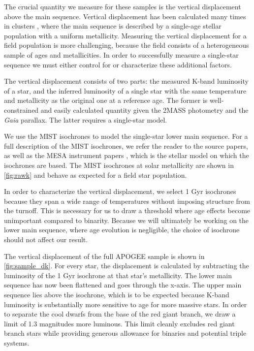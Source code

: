 \documentclass[manuscript]{aastex6}
\newcommand{\Gaia}{\mbox{\textit{Gaia}}}
\newcommand{\gvs}{\authorcomment1}
\begin{document}
\gvs{Under Construction}

The crucial quantity we measure for these samples is the vertical displacement
above the main sequence. Vertical displacement has been calculated many times
in clusters \citep{Mermillod92}, where the main sequence is described by a
single-age stellar population with a uniform metallicity. Measuring the
vertical displacement for a field population is more challenging, because the
field consists of a heterogeneous sample of ages and metallicities. In order to
successfully measure a single-star sequence we must either control for or
characterize these additional factors. 

The vertical displacement consists of two parts: the measured K-band
luminosity of a star, and the inferred luminosity of a single star with the
same temperature and metallicity as the original one at a reference age. The 
former is well-constrained and easily calculated quantity given the 2MASS 
photometry and the \Gaia{} parallax. The latter requires a single-star model.

We use the MIST \citep{Dotter16,Choi16} isochrones to model the 
single-star lower main sequence. For a full description of the MIST 
isochrones, we refer the reader to the source papers, as well as the MESA 
instrument papers \citep{Paxton11, Paxton13, Paxton15}, which is the stellar 
model on which the isochrones are based. The MIST isochrones at solar
metallicity are shown in \cref{fig:rawk} and behave as expected for a field
star population.

In order to characterize the vertical displacement, we select 1 Gyr isochrones 
because they span a wide range of temperatures without imposing
structure from the turnoff. This is necessary for us to draw a threshold where 
age effects become unimportant compared to binarity. Because we will 
ultimately be working on the lower main sequence, where age evolution is 
negligible, the choice of isochrone should not affect our result. 

The vertical displacement of the full APOGEE sample is shown in 
\cref{fig:sample_dk}. For every star, the displacement is calculated by
subtracting the luminosity of the 1 Gyr isochrone at that star's metallicity.
The lower main sequence has now been flattened and goes through the x-axis. The
upper main sequence lies above the isochrone, which is to be expected because
K-band luminosity is substantially more sensitive to age for more massive
stars. In order to separate the cool dwarfs from the base of the red giant 
branch, we draw a limit of 1.3 magnitudes more luminous. This limit
cleanly excludes red giant branch stars while providing generous allowance for
binaries and potential triple systems.
\end{document}
